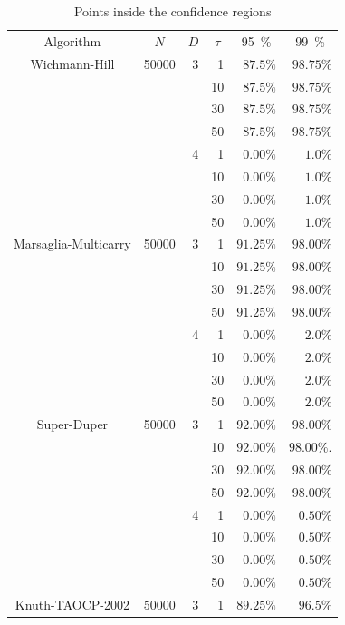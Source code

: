 \documentclass[12pt]{article}
\begin{document}
\begin{description}
\begin{table}[!h]
\centering
\caption{Points inside the confidence regions}
\label{tab:result1}
\begin{tabular}{c*{5}r}
	\toprule
	Algorithm & \multicolumn{1}{c}{$N$} & \multicolumn{1}{c}{$D$} & \multicolumn{1}{c}{$\tau$} & \multicolumn{1}{c}{\SI{95}{\percent}} & \multicolumn{1}{c}{\SI{99}{\percent}}\\
	\cmidrule(lr){1-1}
	\cmidrule(lr){2-2}
	\cmidrule(lr){3-3}
	\cmidrule(lr){4-4}
	\cmidrule(lr){5-5}
	\cmidrule(lr){6-6}
	Wichmann-Hill & 50000 & 3 & 1 & $87.5\%$ & $98.75\%$\\
	&  & & 10 & $87.5\%$ & $98.75\%$\\
	&  & & 30 & $87.5\%$ & $98.75\%$\\
	&  & & 50 & $87.5\%$ & $98.75\%$\\ 
	\cmidrule(lr){3-6}
	&  & 4 & 1 & $0.00\%$ & $1.0\%$\\
	&  &   & 10& $0.00\%$ & $1.0\%$\\
	&  &  & 30 & $0.00\%$ & $1.0\%$\\
	&  &  & 50 & $0.00\%$ & $1.0\%$\\
	\cmidrule(lr){1-6}
	Marsaglia-Multicarry & 50000 & 3 & 1 & $91.25\%$ & $98.00\%$\\
	&  & & 10 & $91.25\%$ & $98.00\%$\\
	&  & & 30 & $91.25\%$ & $98.00\%$\\
	&  & & 50 & $91.25\%$ & $98.00\%$\\ 
	\cmidrule(lr){3-6}
	&  & 4 & 1 & $0.00\%$ & $2.0\%$\\
	&  &   & 10& $0.00\%$ & $2.0\%$\\
	&  &  & 30 & $0.00\%$ & $2.0\%$\\
	&  &  & 50 & $0.00\%$ & $2.0\%$\\
	\cmidrule(lr){1-6}
	Super-Duper & 50000 & 3 & 1 & $92.00\%$ & $98.00\%$\\
	&  & & 10 & $92.00\%$ & $98.00\%.$\\
	&  & & 30 & $92.00\%$ & $98.00\%$\\
	&  & & 50 & $92.00\%$ & $98.00\%$\\ 
	\cmidrule(lr){3-6}
	&  & 4 & 1 & $0.00\%$ & $0.50\%$\\
	&  &   & 10& $0.00\%$ & $0.50\%$\\
	&  &  & 30 & $0.00\%$ & $0.50\%$\\
	&  &  & 50 & $0.00\%$ & $0.50\%$\\
	\cmidrule(lr){1-6}
	Knuth-TAOCP-2002 & 50000 & 3 & 1 & $89.25\%$ & $96.5\%$\\

\end{tabular}
\end{table}
\end{description}
\end{document}
